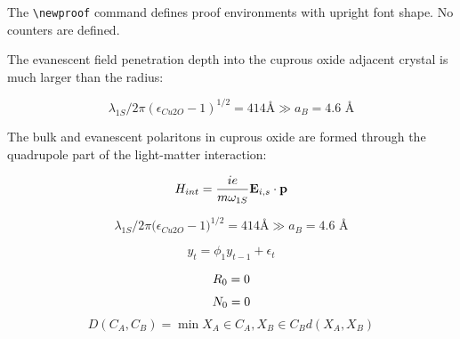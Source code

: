\documentclass[a4paper,fleqn]{cas-dc}
\begin{document}
The \verb+\newproof+ command defines proof environments with
upright font shape. No counters are defined. 

\begin{theorem}\label{thm}
	The \WGM evanescent field penetration depth into the cuprous oxide
	adjacent crystal is much larger than the \QE radius: 
	
	\begin{equation*} %
	\lambda_{1S}/2 \pi \left({\epsilon_{Cu2O}-1}\right)^{1/2} = 414 \mbox{
		\AA} \gg a_B = 4.6 \mbox{ \AA}  
	\end{equation*}
	
\end{theorem}

\begin{definition}
	The bulk and evanescent polaritons in cuprous oxide
	are formed through the quadrupole part of the light-matter
	interaction:
	
	\begin{equation*}
	H_{int} = \frac{i e }{m \omega_{1S}} {\bf E}_{i,s} \cdot {\bf p}
	\end{equation*}
	
\end{definition}
%
\begin{equation} 	%
\lambda_{1S}/2 \pi \Big({\epsilon_{Cu2O}-1}\Big)^{1/2} = 414 \mbox{
	\AA} \gg a_B = 4.6 \mbox{ \AA}  
\label{Eq.2}
\end{equation}

\begin{equation}
y_{t} = \phi_{1} y_{t-1} + \epsilon_{t}
\label{Eq.3}
\end{equation}

\begin{subequations}
\setlength{\jot}{6pt} %
	\begin{gather}
	R_0 = 0 \label{Eq.4a}\\
	N_0 = 0 \label{Eq.4b}
	\end{gather}
	\label{Eq.4}
\end{subequations}
%
\begin{equation}
D\left(C_{A},C_{B}\right) = \min X_{A}\in C_{A},X_{B}\in C_{B} 
d\left(X_{A},X_{B}\right)
\label{Eq.5}
\end{equation}

\end{document}
